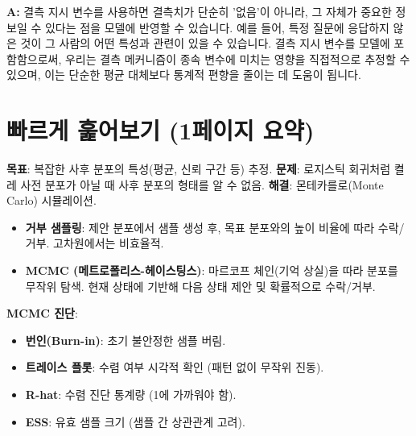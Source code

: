 \documentclass[11pt,a4paper]{article}
\theoremstyle{definition}
\newcommand{\newsection}[1]{\newpage\section{#1}}
\begin{document}
\begin{tcolorbox}[infobox, title={Q: 결측 지시 변수를 사용하는 것이 왜 더 나은 방법인가요?}]
\textbf{A:} 결측 지시 변수를 사용하면 결측치가 단순히 '없음'이 아니라, 그 자체가 중요한 정보일 수 있다는 점을 모델에 반영할 수 있습니다. 예를 들어, 특정 질문에 응답하지 않은 것이 그 사람의 어떤 특성과 관련이 있을 수 있습니다. 결측 지시 변수를 모델에 포함함으로써, 우리는 결측 메커니즘이 종속 변수에 미치는 영향을 직접적으로 추정할 수 있으며, 이는 단순한 평균 대체보다 통계적 편향을 줄이는 데 도움이 됩니다.
\end{tcolorbox}

\newsection{빠르게 훑어보기 (1페이지 요약)}

\begin{summarybox}[title={베이즈 사후 분포 샘플링}]
\textbf{목표}: 복잡한 사후 분포의 특성(평균, 신뢰 구간 등) 추정.
\textbf{문제}: 로지스틱 회귀처럼 켤레 사전 분포가 아닐 때 사후 분포의 형태를 알 수 없음.
\textbf{해결}: 몬테카를로(Monte Carlo) 시뮬레이션.
\begin{itemize}
    \item \textbf{거부 샘플링}: 제안 분포에서 샘플 생성 후, 목표 분포와의 높이 비율에 따라 수락/거부. 고차원에서는 비효율적.
    \item \textbf{MCMC (메트로폴리스-헤이스팅스)}: 마르코프 체인(기억 상실)을 따라 분포를 무작위 탐색. 현재 상태에 기반해 다음 상태 제안 및 확률적으로 수락/거부.
\end{itemize}
\textbf{MCMC 진단}:
\begin{itemize}
    \item \textbf{번인(Burn-in)}: 초기 불안정한 샘플 버림.
    \item \textbf{트레이스 플롯}: 수렴 여부 시각적 확인 (패턴 없이 무작위 진동).
    \item \textbf{R-hat}: 수렴 진단 통계량 (1에 가까워야 함).
    \item \textbf{ESS}: 유효 샘플 크기 (샘플 간 상관관계 고려).
\end{itemize}
\end{summarybox}

\vspace{1em}
\end{document}
